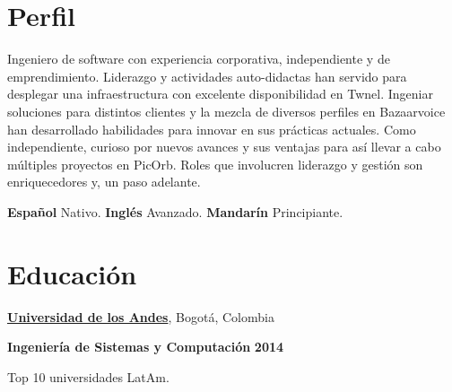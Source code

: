 \section{Perfil}
%
Ingeniero de software con experiencia corporativa, independiente y de
emprendimiento. Liderazgo y actividades auto-didactas
han servido para desplegar una infraestructura con excelente disponibilidad en
Twnel. Ingeniar soluciones para distintos clientes y la mezcla
de diversos perfiles en Bazaarvoice han desarrollado habilidades para
innovar en sus prácticas actuales. Como independiente, curioso por nuevos
avances y sus ventajas para así llevar a cabo múltiples proyectos en PicOrb. Roles que
involucren liderazgo y gestión son enriquecedores y, un paso adelante.

\vspace{3.5mm}
\textbf{Español} Nativo. \textbf{Inglés} Avanzado. \textbf{Mandarín}
Principiante.
	
\section{Educaci\'on}
%
\href{http://www.topuniversities.com/universities/universidad-de-los-andes}{\textbf{Universidad de los Andes}},
Bogot\'{a}, Colombia
\begin{outerlist}
\item[\FA \faAngleDoubleRight] \textbf{Ingenier\'ia de Sistemas y Computaci\'on}
\hfill \textbf{2014}
\end{outerlist}
     \begin{innerlist}
     	\item Top 10 universidades LatAm.
     \end{innerlist}

